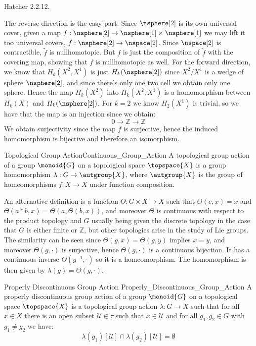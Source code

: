 \documentclass{book}                                                           %
\begin{document}
\begin{problem}
    Hatcher 2.2.12.
\end{problem}
\begin{solution}
    The reverse direction is the easy part. Since $\nsphere[2]$ is its own
    universal cover, given a map $f:\nsphere[2]\rightarrow\nsphere[1]\times\nsphere[1]$
    we may lift it too universal covers, $\tilde{f}:\nsphere[2]\rightarrow\nspace[2]$.
    Since $\nspace[2]$ is contractible, $\tilde{f}$ is nullhomotopic. But
    $f$ is just the composition of $\tilde{f}$ with the covering map,
    showing that $f$ is nullhomotopic as well. For the forward direction,
    we know that $H_{k}(X^{2},X^{1})$ is just $H_{k}(\nsphere[2])$ since
    $X^{2}/X^{1}$ is a wedge of sphere $\nsphere[2]$, and since there's only
    one two cell we obtain only one sphere. Hence the map
    $H_{k}(X^{2})$ into $H_{k}(X^{2},X^{1})$ is a homomorphism between
    $H_{k}(X)$ and $H_{k}(\nsphere[2])$. For $k=2$ we know $H_{2}(X^{1})$ is
    trivial, so we have that the map is an injection since we obtain:
    \begin{equation}
        0\rightarrow\mathbb{Z}\rightarrow\mathbb{Z}
    \end{equation}
    We obtain surjectivity since the map $f$ is surjective, hence the
    induced homomorphism is bijective and therefore an isomorphism.
\end{solution}
\begin{fdefinition}{Topological Group Action}{Continuous_Group_Action}
    A topological group action of a group $\monoid{G}$ on a topological space
    $\topspace{X}$ is a group homomorphism $\lambda:G\rightarrow\autgroup{X}$,
    where $\autgroup{X}$ is the group of homeomorphisms $f:X\rightarrow{X}$
    under function composition.
\end{fdefinition}
An alternative definition is a function $\Theta:G\times{X}\rightarrow{X}$
such that $\Theta(e,x)=x$ and $\Theta(a*b,x)=\Theta(a,\Theta(b,x))$, and
moreover $\Theta$ is continuous with respect to the product topology and
$G$ usually being given the discrete topology in the case that $G$ is either
finite or $\mathbb{Z}$, but other topologies arise in the study of Lie
groups. The similarity can be seen since $\Theta(g,x)=\Theta(g,y)$ implies
$x=y$, and moreover $\Theta(g,\cdot)$ is surjective, hence $\Theta(g,\cdot)$
is a continuous bijection. It has a continuous inverse $\Theta(g^{\minus{1}},\cdot)$
so it is a homeomorphism. The homomorphism is then given by
$\lambda(g)=\Theta(g,\cdot)$.
\begin{fdefinition}{Properly Discontinuous Group Action}
                   {Properly_Discontinuous_Group_Action}
    A properly discontinuous group action of a group $\monoid{G}$ on a
    topological space $\topspace{X}$ is a topological group action
    $\lambda:G\rightarrow{X}$ such that for all $x\in{X}$ there is an open
    subset $\mathcal{U}\in\tau$ such that $x\in\mathcal{U}$ and
    for all $g_{1},g_{2}\in{G}$ with $g_{1}\ne{g}_{2}$ we have:
    \begin{equation*}
        \lambda(g_{1})[\mathcal{U}]\cap\lambda(g_{2})[\mathcal{U}]=\emptyset
    \end{equation*}
\end{fdefinition}
\end{document}
